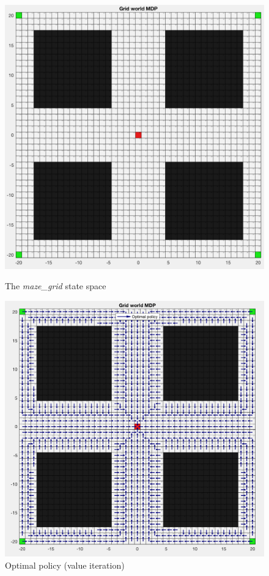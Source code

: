 \documentclass[a4paper]{report}
\begin{document}
{{			\begin{figure}[ht!]
				\begin{minipage}{0.45\linewidth}
					\includegraphics[width=\linewidth]{maze_grid}
					\caption{The \emph{maze\_grid} state space}
					\label{fig::maze_display}
				\end{minipage}
				\hfill
				\begin{minipage}{0.45\linewidth}
					\includegraphics[width=\linewidth]{maze_optimal_policy}
					\caption{Optimal policy (value iteration)}
					\label{fig::maze_optimal_policy}
				\end{minipage}
			\end{figure}
				
}}
\end{document}
